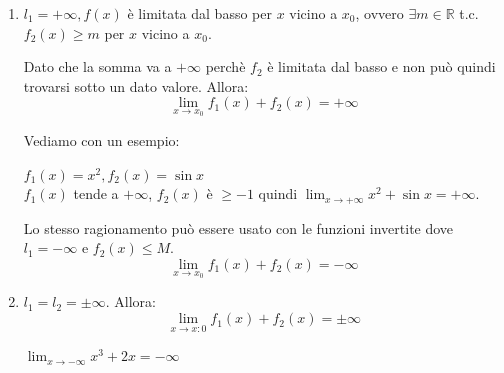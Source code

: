 \renewcommand{\labelenumii}{\arabic{enumi}.\arabic{enumii}}
\begin{enumerate}[label=\textbf{\arabic*})]
    \item $l_1=+\infty, f(x)$ è limitata dal basso per $x$ vicino a $x_0$, ovvero $\exists m\in\mathbb{R}$ t.c. $f_2(x)\geq m$ per $x$ vicino a $x_0$.
    
    
    Dato che la somma va a $+\infty$ perchè $f_2$ è limitata dal basso e non può quindi trovarsi sotto un dato valore. Allora:
    \begin{equation}
        \lim_{x\to x_0}f_1(x)+f_2(x)=+\infty
    \end{equation}
    
    Vediamo con un esempio:
    \begin{example}
        $f_1(x)=x^2, f_2(x)=\sin x$\\$f_1(x)$ tende a $+\infty$, $f_2(x)$ è $\geq -1$ quindi $\lim_{x\to+\infty}x^2+\sin x=+\infty$.
        
        
    \end{example}
    
    Lo stesso ragionamento può essere usato con le funzioni invertite dove $l_1=-\infty$ e $f_2(x)\leq M$.
    \begin{equation}
        \lim_{x\to x_0}f_1(x)+f_2(x)=-\infty
    \end{equation}
    
    \item $l_1=l_2=\pm\infty$. Allora:
    \begin{equation}
        \lim_{x\to x:0}f_1(x)+f_2(x)=\pm\infty
    \end{equation}
    \begin{example}
        $\lim_{x\to-\infty}x^3+2x=-\infty$
    \end{example}
    

\end{enumerate}

